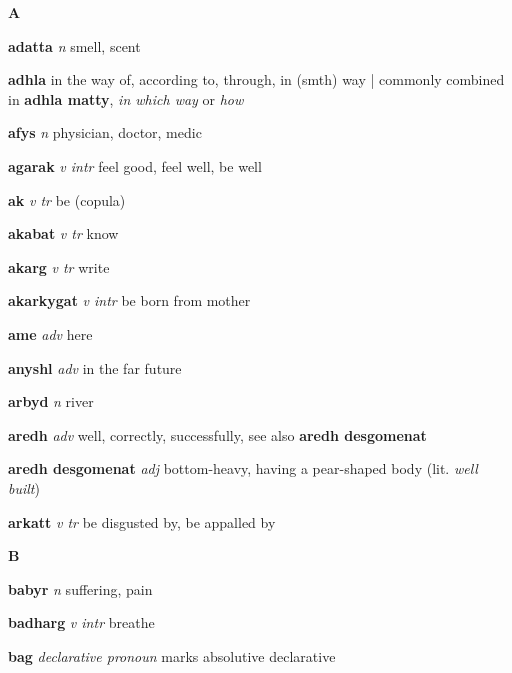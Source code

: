\begin{center} \Huge \bfseries A \end{center}\textbf{adatta}   \emph{n} \textperiodcentered smell, scent

\textbf{adhla}    \textperiodcentered in the way of, according to, through, in (smth) way | commonly combined in \textbf{adhla matty}, \emph{in which way} or \emph{how}

\textbf{afys}   \emph{n} \textperiodcentered physician, doctor, medic

\textbf{agarak}   \emph{v intr} \textperiodcentered feel good, feel well, be well

\textbf{ak}   \emph{v tr} \textperiodcentered be (copula)

\textbf{akabat}   \emph{v tr} \textperiodcentered know

\textbf{akarg}   \emph{v tr} \textperiodcentered write

\textbf{akarkygat}   \emph{v intr} \textperiodcentered be born from mother \ABL

\textbf{ame}   \emph{adv} \textperiodcentered here

\textbf{anyshl}   \emph{adv} \textperiodcentered in the far future

\textbf{arbyd}   \emph{n} \textperiodcentered river

\textbf{aredh}   \emph{adv} \textperiodcentered well, correctly, successfully, see also \textbf{aredh desgomenat}

\textbf{aredh desgomenat}   \emph{adj} \textperiodcentered bottom-heavy, having a pear-shaped body (lit. \emph{well built})

\textbf{arkatt}   \emph{v tr} \textperiodcentered be disgusted by, be appalled by

\begin{center} \Huge \bfseries B \end{center}\textbf{babyr}   \emph{n} \textperiodcentered suffering, pain

\textbf{badharg}   \emph{v intr} \textperiodcentered breathe

\textbf{bag}   \emph{declarative pronoun} \textperiodcentered marks absolutive declarative

